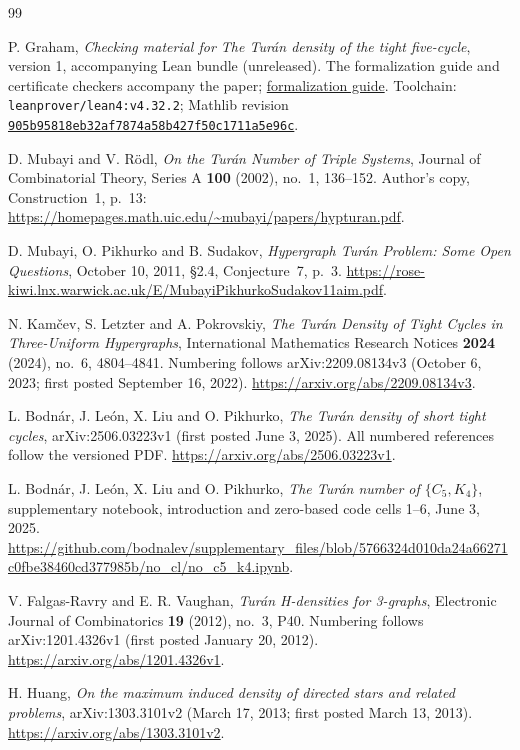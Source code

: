 \documentclass[11pt]{article}
\begin{document}
\begin{thebibliography}{99}

P. Graham,
\emph{Checking material for The Tur\'an density of the tight five-cycle},
version 1, accompanying Lean bundle (unreleased).
The formalization guide and certificate checkers accompany the paper;
\href{../checks/FORMALIZATION.md}{formalization guide}.
Toolchain: \texttt{leanprover/lean4:v4.32.2}; Mathlib revision
\href{https://github.com/leanprover-community/mathlib4/tree/905b95818eb32af7874a58b427f50c1711a5e96c}{\texttt{905b95818eb32af7874a58b427f50c1711a5e96c}}.

\small
{}
D. Mubayi and V. R\"odl,
\emph{On the Tur\'an Number of Triple Systems},
Journal of Combinatorial Theory, Series A \textbf{100} (2002), no.~1,
136--152. Author's copy, Construction~1, p.~13:
\url{https://homepages.math.uic.edu/~mubayi/papers/hypturan.pdf}.

D. Mubayi, O. Pikhurko and B. Sudakov,
\emph{Hypergraph Tur\'an Problem: Some Open Questions},
October 10, 2011, \S2.4, Conjecture~7, p.~3.
\url{https://rose-kiwi.lnx.warwick.ac.uk/E/MubayiPikhurkoSudakov11aim.pdf}.

N. Kam\v{c}ev, S. Letzter and A. Pokrovskiy,
\emph{The Tur\'an Density of Tight Cycles in Three-Uniform Hypergraphs},
International Mathematics Research Notices \textbf{2024} (2024), no.~6,
4804--4841. Numbering follows arXiv:2209.08134v3
(October 6, 2023; first posted September 16, 2022).
\url{https://arxiv.org/abs/2209.08134v3}.

L. Bodn\'ar, J. Le\'on, X. Liu and O. Pikhurko,
\emph{The Tur\'an density of short tight cycles},
arXiv:2506.03223v1 (first posted June 3, 2025).
All numbered references follow the versioned PDF.
\url{https://arxiv.org/abs/2506.03223v1}.

L. Bodn\'ar, J. Le\'on, X. Liu and O. Pikhurko,
\emph{The Tur\'an number of $\{C_5,K_4\}$}, supplementary notebook,
introduction and zero-based code cells 1--6, June 3, 2025.
\url{https://github.com/bodnalev/supplementary_files/blob/5766324d010da24a66271c0fbe38460cd377985b/no_cl/no_c5_k4.ipynb}.

V. Falgas-Ravry and E. R. Vaughan,
\emph{Tur\'an H-densities for 3-graphs},
Electronic Journal of Combinatorics \textbf{19} (2012), no.~3, P40.
Numbering follows arXiv:1201.4326v1 (first posted January 20, 2012).
\url{https://arxiv.org/abs/1201.4326v1}.

H. Huang,
\emph{On the maximum induced density of directed stars and related problems},
arXiv:1303.3101v2 (March 17, 2013; first posted March 13, 2013).
\url{https://arxiv.org/abs/1303.3101v2}.


\end{thebibliography}
\end{document}
